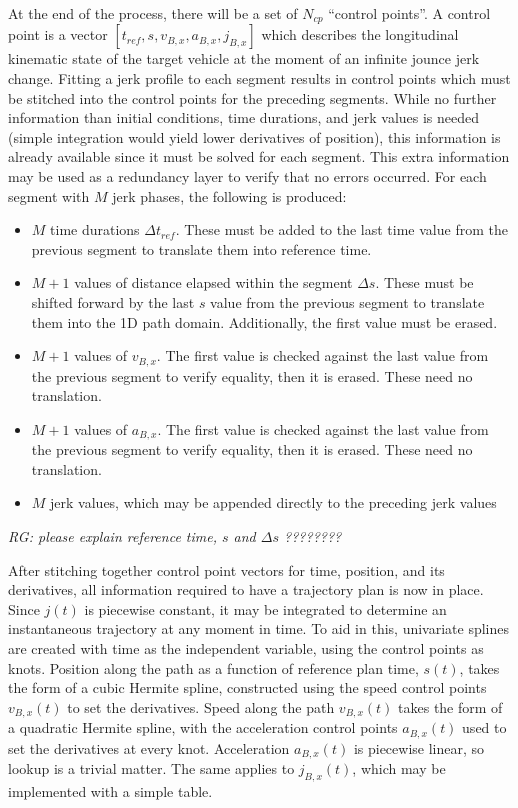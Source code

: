 \documentclass[letterpaper, 10 pt, conference]{ieeeconf}  %
\begin{document}
At the end of the process, there will be a set of $N_{cp}$ ``control points''.
A control point is a vector $[t_{ref}, s, v_{B,x}, a_{B,x}, j_{B,x}]$ which describes the longitudinal kinematic state of the target vehicle at the moment of an infinite jounce jerk change.
Fitting a jerk profile to each segment results in control points which must be stitched into the control points for the preceding segments.
While no further information than initial conditions, time durations, and jerk values is needed (simple integration would yield lower derivatives of position), this information is already available since it must be solved for each segment.
This extra information may be used as a redundancy layer to verify that no errors occurred.
For each segment with $M$ jerk phases, the following is produced:
\begin{itemize}
  \item $M$ time durations $\Delta t_{ref}$. These must be added to the last time value from the previous segment to translate them into reference time.
  \item $M+1$ values of distance elapsed within the segment $\Delta s$. These must be shifted forward by the last $s$ value from the previous segment to translate them into the 1D path domain. Additionally, the first value must be erased.
  \item $M+1$ values of $v_{B,x}$. The first value is checked against the last value from the previous segment to verify equality, then it is erased. These need no translation.
  \item $M+1$ values of $a_{B,x}$. The first value is checked against the last value from the previous segment to verify equality, then it is erased. These need no translation.
  \item $M$ jerk values, which may be appended directly to the preceding jerk values
\end{itemize}

\emph{RG: please explain reference time, $s$ and $\Delta s$ ????????}

After stitching together control point vectors for time, position, and its derivatives, all information required to have a trajectory plan is now in place.
Since $j(t)$ is piecewise constant, it may be integrated to determine an instantaneous trajectory at any moment in time.
To aid in this, univariate splines are created with time as the independent variable, using the control points as knots.
Position along the path as a function of reference plan time, $s(t)$, takes the form of a cubic Hermite spline, constructed using the speed control points $v_{B,x}(t)$ to set the derivatives.
Speed along the path $v_{B,x}(t)$ takes the form of a quadratic Hermite spline, with the acceleration control points $a_{B,x}(t)$ used to set the derivatives at every knot.
Acceleration $a_{B,x}(t)$ is piecewise linear, so lookup is a trivial matter.
The same applies to $j_{B,x}(t)$, which may be implemented with a simple table.
\end{document}
